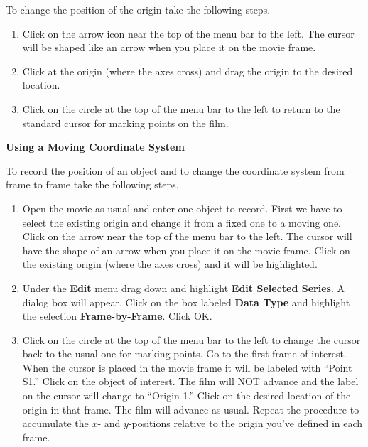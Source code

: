 To change the position of the origin take the following steps.

\begin{enumerate}
\item Click on the arrow icon near the top of the menu bar to the left.
The cursor will be shaped like an arrow when you place it on the movie
frame. 
\item Click at the origin (where the axes cross) and drag the origin to
the desired location. 
\item Click on the circle at the top of the menu bar to the left to return
to the standard cursor for marking points on the film. 
\end{enumerate}
\textbf{Using a Moving Coordinate System} 

To record the position of an object and to change the coordinate system
from frame to frame take the following steps.

\begin{enumerate}
\item Open the movie as usual and enter one object to record. First we have
to select the existing origin and change it from a fixed one to a
moving one. Click on the arrow near the top of the menu bar to the
left. The cursor will have the shape of an arrow when you place it
on the movie frame. Click on the existing origin (where the axes cross)
and it will be highlighted.
\item Under the \textbf{Edit} menu drag down and highlight \textbf{Edit
Selected Series}. A dialog box will appear. Click on the box labeled
\textbf{Data Type} and highlight the selection \textbf{Frame-by-Frame}.
Click OK.
\item Click on the circle at the top of the menu bar to the left to change
the cursor back to the usual one for marking points. Go to the first
frame of interest. When the cursor is placed in the movie frame it
will be labeled with ``Point S1.'' Click on the object of interest.
The film will NOT advance and the label on the cursor will change
to ``Origin 1.'' Click on the desired location of the origin
in that frame. The film will advance as usual. Repeat the procedure
to accumulate the $x$- and $y$-positions relative to the origin you've
defined in each frame.\end{enumerate}

